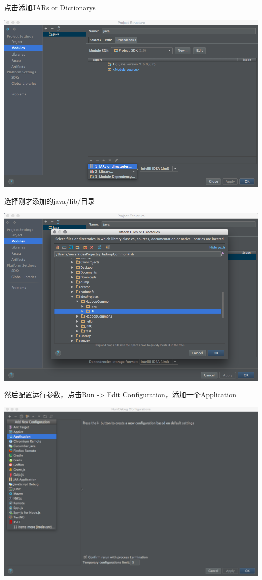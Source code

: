 点击添加JARs or Dictionarys

\includegraphics[width=\textwidth]{image/env/cr28.png}

选择刚才添加的java/lib/目录

\includegraphics[width=\textwidth]{image/env/cr29.png}

然后配置运行参数，点击Run -> Edit Configuration，添加一个Application

\includegraphics[width=\textwidth]{image/env/cr30.png}


